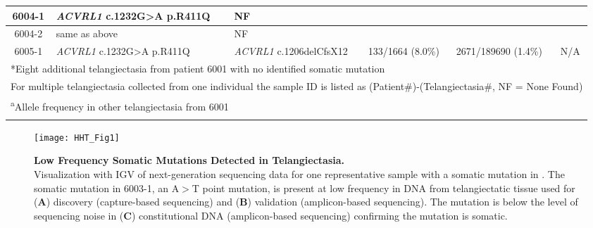 \begin{sidewaystable}[]
\begin{tabularx}{\textheight}{c p{3.5cm} p{3.5cm} XXX}
6004-1 & \textit{ACVRL1} \newline c.1232G\textgreater{}A p.R411Q & NF &	 & & \\\hline
6004-2 & same as above & NF & & & \\\hline
6005-1 & \textit{ACVRL1} \newline c.1232G\textgreater{}A p.R411Q & \textit{ACVRL1} \newline c.1206delCfsX12 & 133/1664 (8.0\%) & 2671/189690 (1.4\%) & N/A \\
\bottomrule
\multicolumn{6}{l}{*Eight additional telangiectasia from patient 6001 with no identified somatic mutation} \\
\multicolumn{6}{l}{For multiple telangiectasia collected from one individual the sample ID is listed as (Patient\#)-(Telangiectasia\#, NF = None Found)} \\
\multicolumn{6}{l}{\textsuperscript{a}Allele frequency in other telangiectasia from 6001} \\
\label{HHT_Table_1}
\end{tabularx}

\end{sidewaystable}



\begin{figure}[tbp!]
\begin{center}
\texttt{[image: HHT\_Fig1]}
\end{center}
\caption[Low Frequency Somatic Mutations Detected in Telangiectasia] {\textbf{Low Frequency Somatic Mutations Detected in Telangiectasia.}\\ Visualization with IGV of next-generation sequencing data for one representative sample with a somatic mutation in . The somatic mutation in 6003-1, an A$>$T point mutation, is present at low frequency in DNA from telangiectatic tissue used for (\textbf{A}) discovery (capture-based sequencing) and (\textbf{B}) validation (amplicon-based sequencing). The mutation is below the level of sequencing noise in (\textbf{C}) constitutional DNA (amplicon-based sequencing) confirming the mutation is somatic.}

\label{HHT_Figure_1}
\end{figure}

